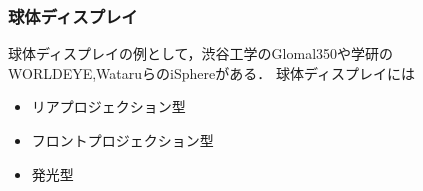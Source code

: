 \subsubsection*{球体ディスプレイ}

球体ディスプレイの例として，渋谷工学のGlomal350\cite{15}や学研の
WORLDEYE\cite{22},WataruらのiSphere\cite{23}がある．
球体ディスプレイには
\begin{itemize}
  \item リアプロジェクション型
  \item フロントプロジェクション型
  \item 発光型
\end{itemize}

